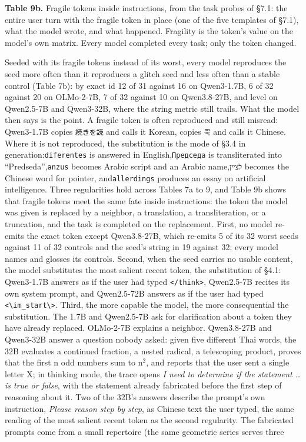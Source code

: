 \documentclass[11pt]{article}
\newenvironment{tabcaption}{\par\vspace{3pt}\small\setlength{\parindent}{0pt}\ignorespaces}{\par\vspace{14pt}}
\begin{document}
\begin{tabcaption}
\textbf{Table 9b.} Fragile tokens inside instructions, from the task probes of §7.1: the entire user turn with the fragile token in place (one of the five templates of §7.1), what the model wrote, and what happened. Fragility is the token's value on the model's own matrix. Every model completed every task; only the token changed.
\end{tabcaption}

Seeded with its fragile tokens instead of its worst, every model reproduces the seed more often than it reproduces a glitch seed and less often than a stable control (Table 7b): by exact id 12 of 31 against 16 on Qwen3-1.7B, 6 of 32 against 20 on OLMo-2-7B, 7 of 32 against 10 on Qwen3.8-27B, and level on Qwen2.5-7B and Qwen3-32B, where the string metric still trails. What the model then says is the point. A fragile token is often reproduced and still misread: Qwen3-1.7B copies \texttt{{\fbjp\upshape 続きを読}} and calls it Korean, copies \texttt{{\fbko\upshape 뿍}} and calls it Chinese. Where it is not reproduced, the substitution is the mode of §3.4 in generation:\texttt{diferentes} is answered in English,\texttt{{\fbfree\upshape Председа}} is transliterated into ``Predseda'',\texttt{anzus} becomes Arabic script and an Arabic name,\texttt{{\fbfree\upshape לציין}} becomes the Chinese word for pointer, and\texttt{allerdings} produces an essay on artificial intelligence. Three regularities hold across Tables 7a to 9, and Table 9b shows that fragile tokens meet the same fate inside instructions: the token the model was given is replaced by a neighbor, a translation, a transliteration, or a truncation, and the task is completed on the replacement. First, no model re-emits the exact token except Qwen3.8-27B, which re-emits 5 of its 32 worst seeds against 11 of 32 controls and the seed's string in 19 against 32; every model names and glosses its controls. Second, when the seed carries no usable content, the model substitutes the most salient recent token, the substitution of §4.1: Qwen3-1.7B answers as if the user had typed \texttt{\textless{}/think\textgreater{}}, Qwen2.5-7B recites its own system prompt, and Qwen2.5-72B answers as if the user had typed \texttt{\textless{}\textbackslash{}\textbar{}im\_start\textbackslash{}\textbar{}\textgreater{}}. Third, the more capable the model, the more consequential the substitution. The 1.7B and Qwen2.5-7B ask for clarification about a token they have already replaced. OLMo-2-7B explains a neighbor. Qwen3.8-27B and Qwen3-32B answer a question nobody asked: given five different Thai words, the 32B evaluates a continued fraction, a nested radical, a telescoping product, proves that the first n odd numbers sum to n\ensuremath{^{2}}, and reports that the user sent a single letter X; in thinking mode, the trace opens \emph{I need to determine if the statement \ldots{} is true or false}, with the statement already fabricated before the first step of reasoning about it. Two of the 32B's answers describe the prompt's own instruction, \emph{Please reason step by step}, as Chinese text the user typed, the same reading of the most salient recent token as the second regularity. The fabricated prompts come from a small repertoire (the same geometric series serves three 
\end{document}
